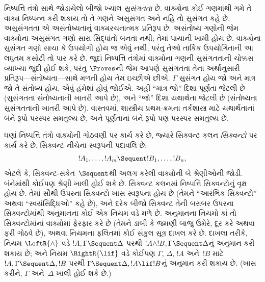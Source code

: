 નિષ્પત્તિ તંત્રો સાથે જોડાયેલો બીજો ખ્યાલ \emph{સુસંગતતા} છે.
વાક્યોના કોઈ ગણમાંથી ગમે તે વાક્ય નિષ્પન્ન કરી શકાય તો તે
ગણને અસુસંગત અને નહિ તો સુસંગત કહે છે. અસુસંગતતા એ અસંતોષ્યતાનું
વાક્યરચનાત્મક પ્રતિરૂપ છે: અસંતોષ્ય ગણોની જેમ વાક્યોના
અસુસંગત ગણો સારા સિદ્ધાંતો બનતા નથી; તેમાં પાયાની ખામી હોય છે.
વાક્યોના સુસંગત ગણો સાચા કે ઉપયોગી હોય જ એવું નથી, પરંતુ
તેઓ તાર્કિક ઉપયોગિતાની આ લઘુતમ કસોટી તો પાર કરે છે. જુદાં
નિષ્પત્તિ તંત્રોમાં વાક્યોના ગણની સુસંગતતાની ચોક્કસ વ્યાખ્યા
જુદી હોઈ શકે, પરંતુ $\Proves$ની જેમ આપણે સુસંગતતા તેના અર્થાનુસારી
પ્રતિરૂપ—સંતોષ્યતા—સાથે મળતી હોય તેમ ઇચ્છીએ છીએ. $\Gamma$ સુસંગત હોય
જો અને માત્ર જો તે સંતોષ્ય હોય, એવું હંમેશાં હોવું જોઈએ. અહીં ``માત્ર
જો'' દિશા પૂર્ણતા જેટલી છે (સુસંગતતા સંતોષ્યતાની ખાતરી આપે છે), અને
``જો'' દિશા યથાર્થતા જેટલી છે (સંતોષ્યતા સુસંગતતાની ખાતરી આપે છે).
વાસ્તવમાં, શાસ્ત્રીય પ્રથમ-ક્રમના તર્કશાસ્ત્ર માટે યથાર્થતાનાં બંને
રૂપો પરસ્પર સમતુલ્ય છે, અને પૂર્ણતાનાં બંને રૂપો પણ પરસ્પર સમતુલ્ય છે.
\endgroup


\begingroup
\makeatletter{}\makeatother


\label{guunit:OLP-0065}


ઘણાં નિષ્પત્તિ તંત્રો વાક્યોની ગોઠવણી પર કાર્ય કરે છે,
જ્યારે સિક્વન્ટ કલન \emph{સિક્વન્ટો} પર કાર્ય કરે છે. સિક્વન્ટ નીચેના
સ્વરૂપની પદાવલિ છે:
\[
!A_1, \dots, !A_m \Sequent !B_1, \dots, !B_n,
\]
એટલે કે, સિક્વન્ટ-સંકેત~$\Sequent$થી અલગ કરેલી વાક્યોની બે
શ્રેણીઓની જોડી. બંનેમાંથી કોઈપણ શ્રેણી ખાલી હોઈ શકે છે. સિક્વન્ટ કલનમાં
નિષ્પત્તિ સિક્વન્ટોનું વૃક્ષ હોય છે. તેમાં સૌથી ઉપરના સિક્વન્ટો
ખાસ સ્વરૂપના હોય છે (તેમને ``આરંભિક સિક્વન્ટો'' અથવા
``સ્વયંસિદ્ધિઓ'' કહે છે), અને દરેક બીજો સિક્વન્ટ તેની બરાબર ઉપરના
સિક્વન્ટોમાંથી અનુમાનના કોઈ એક નિયમ વડે મળે છે. અનુમાનના નિયમો કાં તો
સિક્વન્ટોમાંનાં વાક્યોમાં ફેરફાર કરે છે (તેમને ડાબી કે જમણી
બાજુ ઉમેરે, દૂર કરે અથવા ફરી ગોઠવે છે), અથવા નિયમના ફલિતમાં કોઈ
સંકુલ સૂત્ર દાખલ કરે છે. દાખલા તરીકે, નિયમ $\LeftR{\land}$ વડે
$!A, \Gamma \Sequent \Delta$ પરથી $!A \land !B, \Gamma \Sequent
\Delta$નું અનુમાન કરી શકાય છે; અને નિયમ $\RightR{\lif}$ વડે કોઈપણ
$\Gamma$, $\Delta$, $!A$ અને~$!B$ માટે $!A, \Gamma \Sequent \Delta,
!B$ પરથી $\Gamma \Sequent \Delta, !A \lif !B$નું અનુમાન કરી શકાય છે.
(ખાસ કરીને, $\Gamma$ અને~$\Delta$ ખાલી હોઈ શકે છે.)

